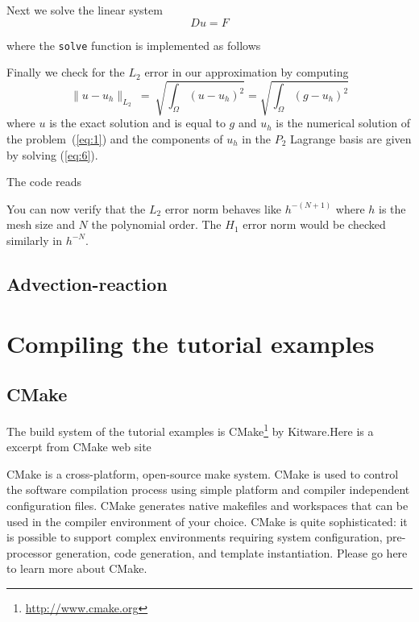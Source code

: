 \documentclass[11pt]{article}
\begin{document}
Next we solve the linear system
\begin{equation}
  \label{eq:6}
  D u = F
\end{equation}

where the \lstinline!solve! function is implemented as follows



Finally we check for the $L_2$ error in our approximation by computing
\begin{equation}
  \label{eq:7}
  \|u-u_h\|_{L_2}\ =\ \sqrt{\int_\Omega (u-u_h)^2} = \sqrt{\int_\Omega (g-u_h)^2}
\end{equation}
where $u$ is the exact solution and is equal to $g$ and $u_h$ is the
numerical solution of the problem~(\ref{eq:1}) and the components of
$u_h$ in the $P_2$ Lagrange basis are given by solving (\ref{eq:6}).

The code reads




You can now verify that the $L_2$ error norm behaves like $h^{-(N+1)}$
where $h$ is the mesh size and $N$ the polynomial order. The $H_1$ error norm
would be checked similarly in $h^{-N}$.

\subsection{Advection-reaction}
\label{sec:advection-reaction}



\appendix
\newpage
\section{Compiling the tutorial examples}
\label{sec:comp-tutor-exampl}


\subsection{CMake}

The build system of the tutorial examples is
CMake\footnote{\url{http://www.cmake.org}} by Kitware.Here is a excerpt from CMake web site

CMake is a cross-platform, open-source make system. CMake is used to
control the software compilation process using simple platform and
compiler independent configuration files. CMake generates native
makefiles and workspaces that can be used in the compiler environment
of your choice. CMake is quite sophisticated: it is possible to
support complex environments requiring system configuration,
pre-processor generation, code generation, and template
instantiation. Please go here to learn more about CMake.
\end{document}
